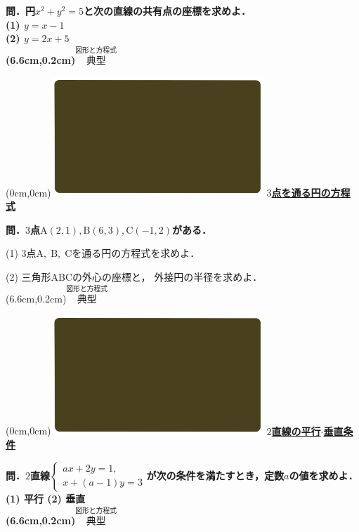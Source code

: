 \documentclass[10pt,
fleqn,
dvipdfmx,
uplatex
]{jsarticle}
\begin{document}
\Large 
\bf\boldmath 問．円$x^2+y^2=5$と次の直線の共有点の座標を求めよ．\\
(1)  $y=x-1$\\
(2)  $y=2x+5$\\

\at(6.6cm,0.2cm){\small\color{bradorange}$\overset{\text{図形と方程式}}{\text{典型}}$}

\newpage

\at(0cm,0cm){\includegraphics[width=8cm,bb=0 0 1920 1080]{./youtube/thumbnails/templates/smart_background/図形と方程式.jpeg}}
{\color{orange}\bf\boldmath\LARGE\underline{$3$点を通る円の方程式}}\vspace{0.3zw}

\normalsize 
\bf\boldmath 問．$3$点$\text{A}\left(2,1\right),\text{B}\left(6,3\right),\text{C}\left(-1,2\right)$がある．

\normalsize
\vspace{0.3zw}
(1)  $3$点$\text{A},\;\text{B},\;\text{C}$を通る円の方程式を求めよ．

\LARGE
(2)  三角形$\text{ABC}$の外心の座標と，
外接円の半径を求めよ．\\

\at(6.6cm,0.2cm){\small\color{bradorange}$\overset{\text{図形と方程式}}{\text{典型}}$}

\newpage

\at(0cm,0cm){\includegraphics[width=8cm,bb=0 0 1920 1080]{./youtube/thumbnails/templates/smart_background/図形と方程式.jpeg}}
{\color{orange}\bf\boldmath\Large\underline{$2$直線の平行$\cdot$垂直条件}}\vspace{0.3zw}

\Large 
\bf\boldmath 問．$2$直線$\left\{\begin{array}{l}ax+2y=1,\\x+\left(a-1\right)y=3\end{array}\right.$が次の条件を満たすとき，定数$a$の値を求めよ．
(1)  平行 \hspace{0.2zw} (2)  垂直\\

\at(6.6cm,0.2cm){\small\color{bradorange}$\overset{\text{図形と方程式}}{\text{典型}}$}
\end{document}
